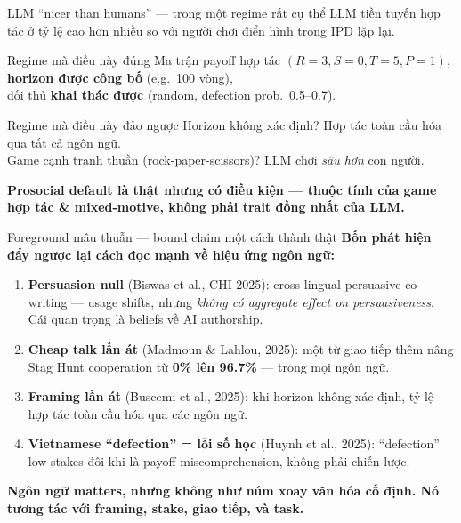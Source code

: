 \documentclass[11pt,aspectratio=169]{beamer}
\newcommand{\takeaway}[1]{%
  \begin{center}
    \colorbox{rsnavy!10}{%
      \begin{minipage}{0.92\textwidth}
        \centering\textbf{#1}
      \end{minipage}}
  \end{center}}
\begin{document}
\begin{frame}{LLM ``nicer than humans'' --- trong một regime rất cụ thể}
    \large
    LLM tiền tuyến hợp tác ở tỷ lệ cao hơn nhiều so với người chơi điển hình trong IPD lặp lại.
    \vspace{0.3cm}
    \begin{block}{Regime mà điều này đúng}
        Ma trận payoff hợp tác $(R{=}3, S{=}0, T{=}5, P{=}1)$, \\
        \textbf{horizon được công bố} (e.g.\ 100 vòng), \\
        đối thủ \textbf{khai thác được} (random, defection prob.\ 0.5--0.7).
    \end{block}
    \vspace{0.3cm}
    \begin{block}{Regime mà điều này đảo ngược}
        Horizon không xác định? Hợp tác toàn cầu hóa qua tất cả ngôn ngữ.\\
        Game cạnh tranh thuần (rock-paper-scissors)? LLM chơi \emph{sâu hơn} con người.
    \end{block}
    \vspace{0.3cm}
    \takeaway{Prosocial default là thật nhưng có điều kiện --- thuộc tính của game hợp tác \& mixed-motive, không phải trait đồng nhất của LLM.}
\end{frame}

\begin{frame}{Foreground mâu thuẫn --- bound claim một cách thành thật}
    \large
    \textbf{Bốn phát hiện đẩy ngược lại cách đọc mạnh về hiệu ứng ngôn ngữ:}
    \vspace{0.3cm}
    \normalsize
    \begin{enumerate}
        \setlength\itemsep{0.4em}
        \item \textbf{Persuasion null} (Biswas et al., CHI 2025): cross-lingual persuasive co-writing --- usage shifts, nhưng \emph{không có aggregate effect on persuasiveness}. Cái quan trọng là beliefs về AI authorship.
        \item \textbf{Cheap talk lấn át} (Madmoun \& Lahlou, 2025): một từ giao tiếp thêm nâng Stag Hunt cooperation từ \textbf{0\% lên 96.7\%} --- trong mọi ngôn ngữ.
        \item \textbf{Framing lấn át} (Buscemi et al., 2025): khi horizon không xác định, tỷ lệ hợp tác toàn cầu hóa qua các ngôn ngữ.
        \item \textbf{Vietnamese ``defection'' = lỗi số học} (Huynh et al., 2025): ``defection'' low-stakes đôi khi là payoff miscomprehension, không phải chiến lược.
    \end{enumerate}
    \vspace{0.3cm}
    \takeaway{Ngôn ngữ matters, nhưng không như núm xoay văn hóa cố định. Nó tương tác với framing, stake, giao tiếp, và task.}
\end{frame}
\end{document}
